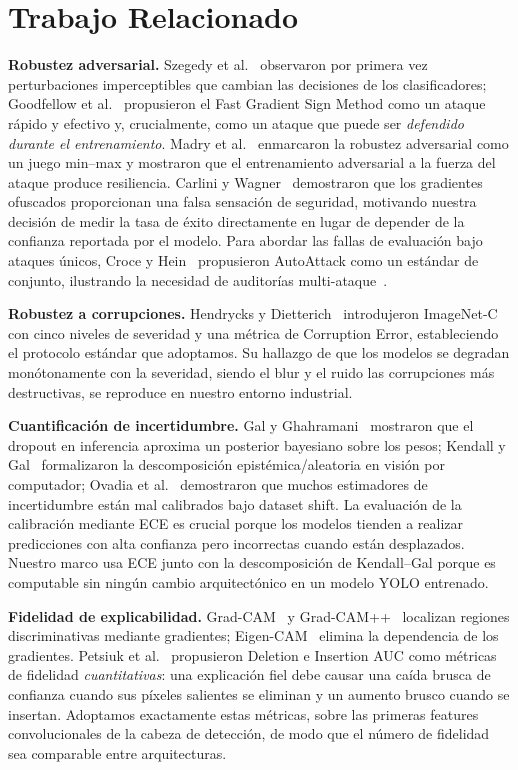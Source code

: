 \documentclass[10pt,twocolumn,letterpaper]{article}
\begin{document}
\section{Trabajo Relacionado}
\label{sec:related}
\textbf{Robustez adversarial.} Szegedy et al.~\cite{szegedy2014intriguing} observaron por primera vez perturbaciones imperceptibles que cambian las decisiones de los clasificadores; Goodfellow et al.~\cite{goodfellow2015fgsm} propusieron el Fast Gradient Sign Method como un ataque rápido y efectivo y, crucialmente, como un ataque que puede ser \emph{defendido durante el entrenamiento}. Madry et al.~\cite{madry2018towards} enmarcaron la robustez adversarial como un juego min--max y mostraron que el entrenamiento adversarial a la fuerza del ataque produce resiliencia. Carlini y Wagner~\cite{carlini2017towards} demostraron que los gradientes ofuscados proporcionan una falsa sensación de seguridad, motivando nuestra decisión de medir la tasa de éxito directamente en lugar de depender de la confianza reportada por el modelo. Para abordar las fallas de evaluación bajo ataques únicos, Croce y Hein~\cite{croce2020reliable} propusieron AutoAttack como un estándar de conjunto, ilustrando la necesidad de auditorías multi-ataque~\cite{silva2020opportunities}.

\textbf{Robustez a corrupciones.} Hendrycks y Dietterich~\cite{hendrycks2019benchmarking} introdujeron ImageNet-C con cinco niveles de severidad y una métrica de Corruption Error, estableciendo el protocolo estándar que adoptamos. Su hallazgo de que los modelos se degradan monótonamente con la severidad, siendo el blur y el ruido las corrupciones más destructivas, se reproduce en nuestro entorno industrial.

\textbf{Cuantificación de incertidumbre.} Gal y Ghahramani~\cite{gal2016dropout} mostraron que el dropout en inferencia aproxima un posterior bayesiano sobre los pesos; Kendall y Gal~\cite{kendall2017uncertainties} formalizaron la descomposición epistémica/aleatoria en visión por computador; Ovadia et al.~\cite{ovadia2019can} demostraron que muchos estimadores de incertidumbre están mal calibrados bajo dataset shift. La evaluación de la calibración mediante ECE es crucial porque los modelos tienden a realizar predicciones con alta confianza pero incorrectas cuando están desplazados. Nuestro marco usa ECE junto con la descomposición de Kendall--Gal porque es computable sin ningún cambio arquitectónico en un modelo YOLO entrenado.

\textbf{Fidelidad de explicabilidad.} Grad-CAM~\cite{selvaraju2017grad} y Grad-CAM++~\cite{chattopadhay2018gradcam} localizan regiones discriminativas mediante gradientes; Eigen-CAM~\cite{muhammad2018eigencam} elimina la dependencia de los gradientes. Petsiuk et al.~\cite{petsiuk2018rise} propusieron Deletion e Insertion AUC como métricas de fidelidad \emph{cuantitativas}: una explicación fiel debe causar una caída brusca de confianza cuando sus píxeles salientes se eliminan y un aumento brusco cuando se insertan. Adoptamos exactamente estas métricas, sobre las primeras features convolucionales de la cabeza de detección, de modo que el número de fidelidad sea comparable entre arquitecturas.
\end{document}
